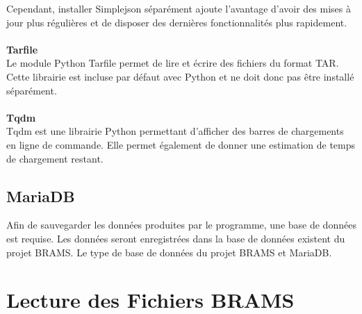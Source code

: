 \documentclass[11pt]{article}
\begin{document}
Cependant, installer Simplejson séparément ajoute l'avantage d'avoir des mises à jour plus régulières et de disposer des dernières fonctionnalités plus rapidement.\\
\\
\textbf{Tarfile}\\
Le module Python Tarfile permet de lire et écrire des fichiers du format TAR.
Cette librairie est incluse par défaut avec Python et ne doit donc pas être installé séparément.\\
\\
\textbf{Tqdm}\\
Tqdm est une librairie Python permettant d'afficher des barres de chargements en ligne de commande.
Elle permet également de donner une estimation de temps de chargement restant.\\

\subsection{MariaDB}

Afin de sauvegarder les données produites par le programme, une base de données est requise.
Les données seront enregistrées dans la base de données existent du projet BRAMS.
Le type de base de données du projet BRAMS et MariaDB.

\newpage

\section{Lecture des Fichiers BRAMS}
\end{document}
